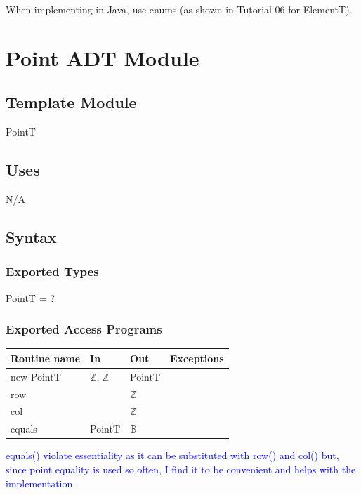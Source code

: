 \documentclass[12pt]{article}
\newcommand{\note}{\noindent \textcolor{blue}}
\begin{document}
When implementing in Java, use enums (as shown in Tutorial 06 for ElementT).

\newpage

\section* {Point ADT Module}

\subsection*{Template Module}

PointT

\subsection* {Uses}

N/A

\subsection* {Syntax}

\subsubsection* {Exported Types}

PointT = ?

\subsubsection* {Exported Access Programs}

\begin{tabular}{| l | l | l | l |}
	\hline
	\textbf{Routine name} & \textbf{In} & \textbf{Out} & \textbf{Exceptions}\\
	\hline
	new PointT & $\mathbb{Z}$, $\mathbb{Z}$ & PointT & \\
	\hline
	row & ~ & $\mathbb{Z}$ & ~\\
	\hline
	col & ~ & $\mathbb{Z}$ & ~\\
	\hline
	equals & PointT & $\mathbb{B}$ & ~\\
\hline
\end{tabular}

\note{equals() violate essentiality as it can be substituted with row() and col() but, since point equality is used so often, I find it to be convenient and helps with the implementation. }\\
\end{document}
